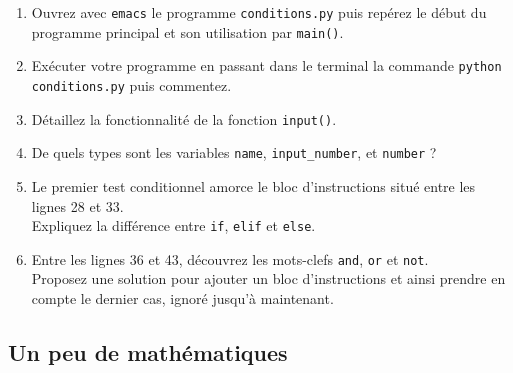 

\begin{enumerate}

\item  Ouvrez avec  \texttt{emacs} le  programme \texttt{conditions.py}
  puis repérez le début du programme principal et son utilisation par
  \texttt{main()}.

\item Exécuter votre programme en passant dans le terminal la commande
  \texttt{python conditions.py} puis commentez.

\item Détaillez la fonctionnalité de la fonction \texttt{input()}.

\item De quels types sont les variables \texttt{name}, \texttt{input\_number},
et \texttt{number} ?

\item Le premier test conditionnel amorce le bloc d'instructions
  situé entre  les lignes 28  et 33.\\ Expliquez la  différence entre
  \texttt{if}, \texttt{elif} et \texttt{else}.

\item  Entre   les  lignes  36   et  43,  découvrez  les   mots-clefs
  \texttt{and}, \texttt{or}  et \texttt{not}.\\ Proposez  une solution
  pour ajouter  un bloc  d'instructions et ainsi  prendre en  compte le
  dernier cas, ignoré jusqu'à maintenant.


\end{enumerate}



\subsection{Un peu de mathématiques}

